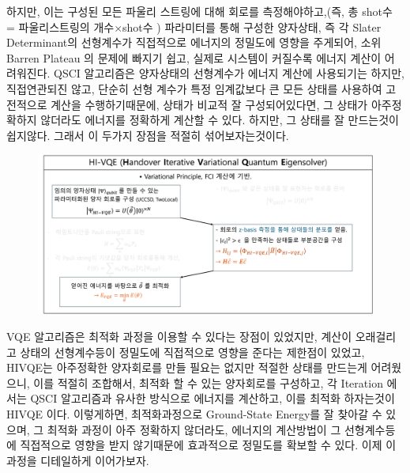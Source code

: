 \documentclass[11pt]{article}
\begin{document}
하지만, 이는 구성된 모든 파울리 스트링에 대해 회로를 측정해야하고,(즉, 총 shot수 = 파울리스트링의 개수\(\times\)shot수 )
파라미터를 통해 구성한 양자상태, 즉 각 Slater Determinant의 선형계수가 직접적으로 에너지의 정밀도에 영향을 주게되어, 소위 Barren Plateau 의 문제에 빠지기 쉽고, 실제로 시스템이 커질수록 에너지 계산이 어려워진다. 
QSCI 알고리즘은 양자상태의 선형계수가 에너지 계산에 사용되기는 하지만, 직접연관되진 않고, 단순히 선형 계수가 특정 임계값보다 큰 모든 상태를 사용하여 고전적으로 계산을 수행하기때문에, 
상태가 비교적 잘 구성되어있다면, 그 상태가 아주정확하지 않더라도 에너지를 정확하게 계산할 수 있다. 하지만, 그 상태를 잘 만드는것이 쉽지않다. 
그래서 이 두가지 장점을 적절히 섞어보자는것이다.
\begin{figure}[H]
  \centering
  \includegraphics[width=\textwidth]{fig/HIVQE_table.png}
  \label{fig:example2}
\end{figure}
VQE 알고리즘은 최적화 과정을 이용할 수 있다는 장점이 있었지만, 계산이 오래걸리고 상태의 선형계수등이 정밀도에 직접적으로 영향을 준다는 제한점이 있었고, 
HIVQE는 아주정확한 양자회로를 만들 필요는 없지만 적절한 상태를 만드는게 어려웠으니, 
이를 적절히 조합해서, 최적화 할 수 있는 양자회로를 구성하고, 각 Iteration 에서는 QSCI 알고리즘과 유사한 방식으로 에너지를 계산하고, 이를 최적화 하자는것이 HIVQE 이다. 
이렇게하면, 최적화과정으로 Ground-State Energy를 잘 찾아갈 수 있으며, 그 최적화 과정이 아주 정확하지 않더라도, 에너지의 계산방법이 그 선형계수등에 직접적으로 영향을 받지 않기때문에
효과적으로 정밀도를 확보할 수 있다. 이제 이 과정을 디테일하게 이어가보자. 
\end{document}
